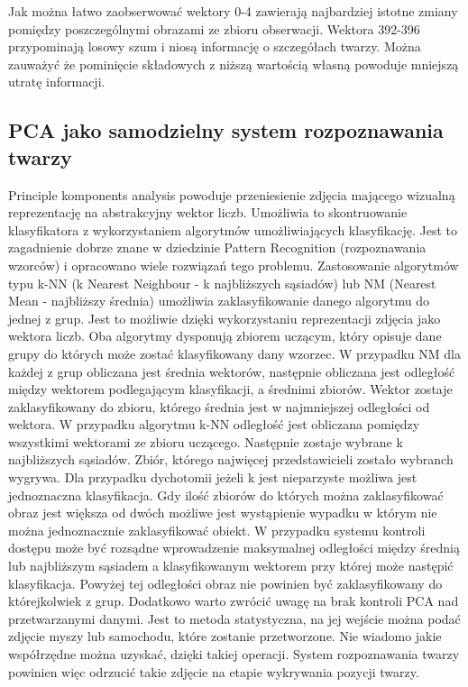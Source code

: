 \documentclass[oneside, eng]{mgr}
\begin{document}
Jak można łatwo zaobserwować wektory 0-4 zawierają najbardziej istotne zmiany pomiędzy poszczególnymi obrazami ze zbioru obserwacji. Wektora 392-396 przypominają losowy szum i niosą informację o szczegółach twarzy. Można zauważyć że pominięcie składowych z niższą wartością własną powoduje mniejszą utratę informacji.

\subsection{PCA jako samodzielny system rozpoznawania twarzy}
Principle komponents analysis powoduje przeniesienie zdjęcia mającego wizualną reprezentację na abstrakcyjny wektor liczb. Umożliwia to skontruowanie klasyfikatora z wykorzystaniem algorytmów umożliwiających klasyfikację. Jest to zagadnienie dobrze znane w dziedzinie Pattern Recognition (rozpoznawania wzorców) i opracowano wiele rozwiązań tego problemu. Zastosowanie algorytmów typu k-NN (k Nearest Neighbour - k najbliższych sąsiadów) lub NM (Nearest Mean - najbliższy średnia) umożliwia zaklasyfikowanie danego algorytmu do jednej z grup. Jest to możliwie dzięki wykorzystaniu reprezentacji zdjęcia jako wektora liczb. Oba algorytmy dysponują zbiorem uczącym, który opisuje dane grupy do których może zostać klasyfikowany dany wzorzec. 
W przypadku NM dla każdej z grup obliczana jest średnia wektorów, następnie obliczana jest odległość między wektorem podlegającym klasyfikacji, a średnimi zbiorów. Wektor zostaje zaklasyfikowany do zbioru, którego średnia jest w najmniejszej odległości od wektora. 
W przypadku algorytmu k-NN odległość jest obliczana pomiędzy wszystkimi wektorami ze zbioru uczącego. Następnie zostaje wybrane k najbliższych sąsiadów. Zbiór, którego najwięcej przedstawicieli zostało wybranch wygrywa. Dla przypadku dychotomii jeżeli k jest nieparzyste możliwa jest jednoznaczna klasyfikacja. Gdy ilość zbiorów do których można zaklasyfikować obraz jest większa od dwóch możliwe jest wystąpienie wypadku w którym nie można jednoznacznie zaklasyfikować obiekt. 
W przypadku systemu kontroli dostępu może być rozsądne wprowadzenie maksymalnej odległości między średnią lub najbliższym sąsiadem a klasyfikowanym wektorem przy której może następić klasyfikacja. Powyżej tej odległości obraz nie powinien być zaklasyfikowany do którejkolwiek z grup. 
Dodatkowo warto zwrócić uwagę na brak kontroli PCA nad przetwarzanymi danymi. Jest to metoda statystyczna, na jej wejście można podać zdjęcie myszy lub samochodu, które zostanie przetworzone. Nie wiadomo jakie współrzędne można uzyskać, dzięki takiej operacji. System rozpoznawania twarzy powinien więc odrzucić takie zdjęcie na etapie wykrywania pozycji twarzy.
\end{document}
